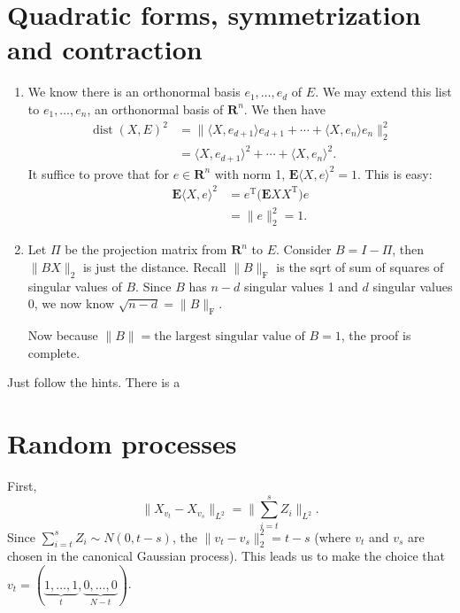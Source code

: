 \documentclass[11pt]{article}
\newcommand{\R}{\mathbf{R}}
\newcommand{\inp}[2]{\langle #1, #2 \rangle}
\newcommand{\nm}[1]{\lVert #1 \rVert}
\newcommand{\trp}{\mathrm T}
\newcommand{\E}{\mathbf{E}}
\theoremstyle{plain}
\theoremstyle{definition}
\theoremstyle{remark}
\theoremstyle{definition}
\newenvironment{mansol}[1]{%
  \renewcommand\themansolinner{#1}%
  \mansolinner
}{\endmansolinner}
\begin{document}
\newpage
\section{Quadratic forms, symmetrization and contraction}
\begin{mansol}{6.3.4}
    \begin{enumerate}[label=(\alph*)]
        \item We know there is an orthonormal basis $e_1,\ldots,e_d$ of $E$. We may extend this list to $e_1,\ldots,e_n$, an orthonormal basis of $\R^n$. We then have \begin{align*}
        \operatorname{dist}(X,E)^2 & = \nm{\inp{X}{e_{d+1}}e_{d+1} + \cdots + \inp{X}{e_n}e_n}_2^2 \\ & = \inp{X}{e_{d+1}}^2 + \cdots + \inp{X}{e_n}^2.
        \end{align*}
    It suffice to prove that for $e \in \R^n$ with norm 1, $\E \inp{X}{e}^2 = 1$. This is easy: 
    \begin{align*}
        \E \inp{X}{e}^2 & = e^\trp \bigl(\E X X^\trp\bigr) e \\ & = \nm{e}_2^2 = 1.
    \end{align*}
    \item Let $\Pi$ be the projection matrix from $\R^n$ to $E$. Consider $B = I - \Pi$, then $\nm{BX}_2$ is just the distance. Recall $\nm{B}_{\mathrm F}$ is the sqrt of sum of squares of singular values of $B$. Since $B$ has $n - d$ singular values 1 and $d$ singular values 0, we now know $\sqrt{n-d} = \nm{B}_{\mathrm F}$.

    Now because $\nm{B} = \text{the largest singular value of }B = 1$, the proof is complete.
    \end{enumerate}
\end{mansol}

\begin{mansol}{6.5.2}
    Just follow the hints. There is a 
\end{mansol}

\newpage
\section{Random processes}
\begin{mansol}{7.1.13}
    First, \[\nm{X_{v_t} - X_{v_s}}_{L^2} = \Big\lVert\sum_{i=t}^s Z_i\Big\rVert_{L^2}.\] Since $\sum_{i=t}^s Z_i \sim N(0,t-s)$, the $\nm{v_t-v_s}_2^2 = t-s$ (where $v_t$ and $v_s$ are chosen in the canonical Gaussian process). This leads us to make the choice that $v_t = (\underbrace{1,\ldots,1}_{t},\underbrace{0,\ldots,0}_{N-t})$.
\end{mansol}

\begin{mansol}{}
    
\end{mansol}

\begin{mansol}{}
    
\end{mansol}
\end{document}
